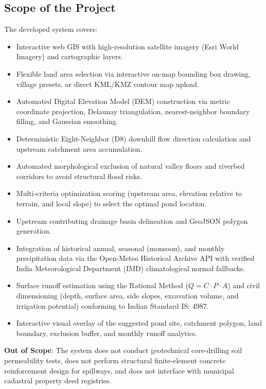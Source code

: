 \documentclass[manuscript,screen,nonacm]{acmart}
\begin{document}
\subsection{Scope of the Project}
The developed system covers:
\begin{itemize}
    \item Interactive web GIS with high-resolution satellite imagery (Esri World Imagery) and cartographic layers.
    \item Flexible land area selection via interactive on-map bounding box drawing, village presets, or direct KML/KMZ contour map upload.
    \item Automated Digital Elevation Model (DEM) construction via metric coordinate projection, Delaunay triangulation, nearest-neighbor boundary filling, and Gaussian smoothing.
    \item Deterministic Eight-Neighbor (D8) downhill flow direction calculation and upstream catchment area accumulation.
    \item Automated morphological exclusion of natural valley floors and riverbed corridors to avoid structural flood risks.
    \item Multi-criteria optimization scoring (upstream area, elevation relative to terrain, and local slope) to select the optimal pond location.
    \item Upstream contributing drainage basin delineation and GeoJSON polygon generation.
    \item Integration of historical annual, seasonal (monsoon), and monthly precipitation data via the Open-Meteo Historical Archive API with verified India Meteorological Department (IMD) climatological normal fallbacks.
    \item Surface runoff estimation using the Rational Method ($Q = C \cdot P \cdot A$) and civil dimensioning (depth, surface area, side slopes, excavation volume, and irrigation potential) conforming to Indian Standard IS: 4987.
    \item Interactive visual overlay of the suggested pond site, catchment polygon, land boundary, exclusion buffer, and monthly runoff analytics.
\end{itemize}

\noindent \textbf{Out of Scope}: The system does not conduct geotechnical core-drilling soil permeability tests, does not perform structural finite-element concrete reinforcement design for spillways, and does not interface with municipal cadastral property deed registries.
\end{document}
